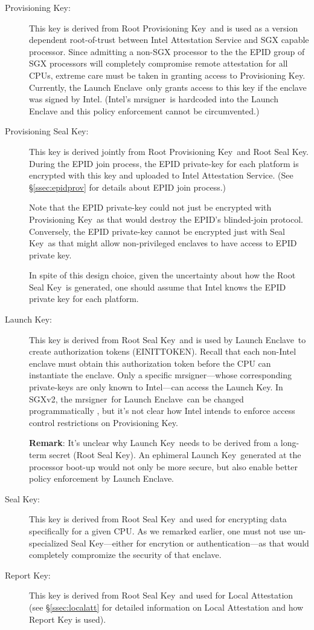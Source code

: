 \documentclass[letterpaper]{article}
\newcommand{\secref}[1]{\S\ref{#1}}
\newcommand{\mrsigner}{\textsf{mrsigner}}
\newcommand{\launchenclave}{\textsf{Launch Enclave}}
\newcommand{\rpk}{\textsf{Root Provisioning Key}}
\newcommand{\pk}{\textsf{Provisioning Key}}
\newcommand{\psk}{\textsf{Provisioning Seal Key}}
\newcommand{\rsk}{\textsf{Root Seal Key}}
\newcommand{\sk}{\textsf{Seal Key}}
\newcommand{\lk}{\textsf{Launch Key}}
\newcommand{\rk}{\textsf{Report Key}}
\begin{document}
  \begin{description}
  \item[\pk:] This key is derived from \rpk\ and is used as a version
    dependent root-of-trust between Intel Attestation Service and SGX
    capable processor. Since admitting a non-SGX processor to the the
    EPID group of SGX processors will completely compromise remote
    attestation for all CPUs, extreme care must be taken in granting
    access to \pk. Currently, the \launchenclave\ only grants access
    to this key if the enclave was signed by Intel. (Intel's
    \mrsigner\ is hardcoded into the \textsf{Launch Enclave} and this
    policy enforcement cannot be circumvented.)

  \item[\psk:] This key is derived jointly from \rpk\ and \rsk. During
    the EPID join process, the EPID private-key for each platform is
    encrypted with this key and uploaded to Intel Attestation
    Service. (See \secref{ssec:epidprov} for details about EPID join
    process.)

    Note that the EPID private-key could not just be encrypted with
    \pk\ as that would destroy the EPID's blinded-join
    protocol. Conversely, the EPID private-key cannot be encrypted
    just with \sk\ as that might allow non-privileged enclaves to have
    access to EPID private key.

    In spite of this design choice, given the uncertainty about how
    the \rsk\ is generated, one should assume that Intel knows the
    EPID private key for each platform.

  \item[\lk:] This key is derived from \rsk\ and is used by
    \launchenclave\ to create authorization tokens
    (\textsf{EINITTOKEN}). Recall that each non-Intel enclave must
    obtain this authorization token before the CPU can instantiate the
    enclave. Only a specific \mrsigner---whose corresponding
    private-keys are only known to Intel---can access the \lk. In
    SGXv2, the \mrsigner\ for \launchenclave\ can be changed
    programmatically \cite[\S39.1.4]{intelsdm}, but it's not clear how
    Intel intends to enforce access control restrictions on \pk.

    \textbf{Remark}: It's unclear why \lk\ needs to be derived from a
    long-term secret (\rsk). An ephimeral \lk\ generated at the
    processor boot-up would not only be more secure, but also enable
    better policy enforcement by \textsf{Launch Enclave}.

  \item[\sk:] This key is derived from \rsk\ and used for encrypting
    data specifically for a given CPU. As we remarked earlier, one
    must not use un-specialized \sk---either for encrytion or
    authentication---as that would completely compromize the security
    of that enclave.

  \item[\rk:] This key is derived from \rsk\ and used for Local
    Attestation (see \secref{ssec:localatt} for detailed information
    on Local Attestation and how Report Key is used).

  \end{description}
\end{document}
